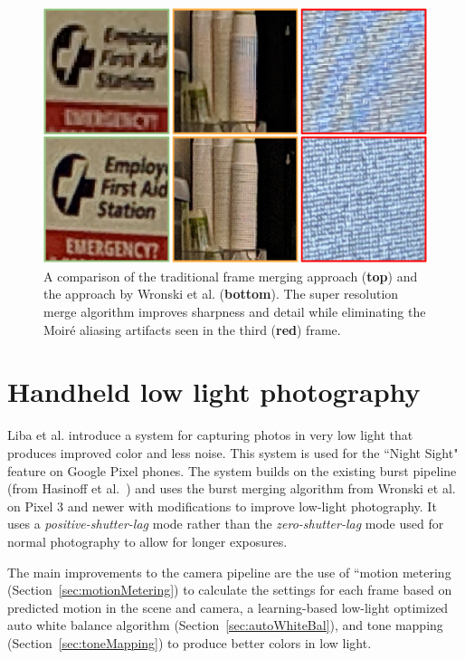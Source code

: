 \documentclass{sig-alternate}
\begin{document}
\begin{figure}
\centering
\includegraphics[width=\columnwidth]{figures/wronski2019-figure-1-100quality-crop.jpg}

\caption{A comparison of the traditional frame merging approach (\textbf{top}) and the approach by Wronski et al. (\textbf{bottom}). The super resolution merge algorithm improves sharpness and detail while eliminating the 
Moiré aliasing artifacts seen in the third (\textbf{red}) frame.~\cite{Wronski2019}}


\label{fig:wronskiResults}
\end{figure}

\section{Handheld low light photography}
\label{sec:handheldLowLight}

Liba et al. \cite{Liba2019} introduce a system for capturing photos in very low light that produces improved color and less noise. This system is used for the ``Night Sight" feature on Google Pixel phones.
The system builds on the existing burst pipeline (from Hasinoff et al.~\cite{Hasinoff2016}) and uses the burst merging algorithm from Wronski et al.~\cite{Wronski2019} on Pixel 3 and newer with modifications to improve low-light photography. It uses a \emph{positive-shutter-lag} mode rather than the \emph{zero-shutter-lag} mode used for normal photography to allow for longer exposures.

The main improvements to the camera pipeline are the use of ``motion metering (Section~\ref{sec:motionMetering}) to calculate the settings for each frame based on predicted motion in the scene and camera, a learning-based low-light optimized auto white balance algorithm (Section~\ref{sec:autoWhiteBal}), and tone mapping (Section~\ref{sec:toneMapping}) to produce better colors in low light.
\end{document}
